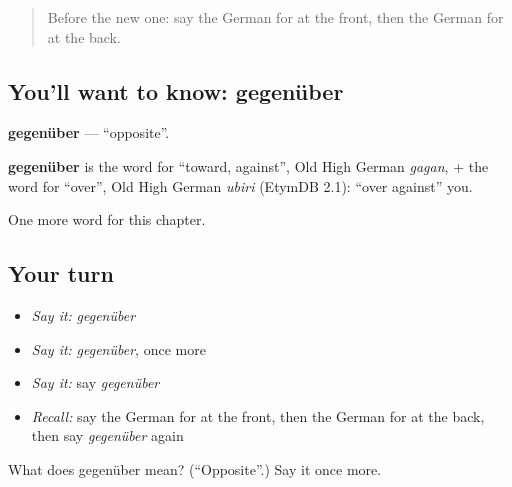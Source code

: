 \begin{quote}
Before the new one: say the German for at the front, then the German for at the back.
\end{quote}

\subsection*{You'll want to know: gegenüber}
\textbf{gegenüber} — \textquotedblleft{}opposite\textquotedblright{}.

\begin{cousinweb}
\textbf{gegenüber} is the word for \textquotedblleft{}toward, against\textquotedblright{}, Old High German \emph{gagan}, + the word for \textquotedblleft{}over\textquotedblright{}, Old High German \emph{ubiri} (EtymDB 2.1): \textquotedblleft{}over against\textquotedblright{} you.
\end{cousinweb}

\begin{grammarlens}[title={What you've built}]
One more word for this chapter.
\end{grammarlens}

\subsection*{Your turn}
\begin{itemize}
\raggedright
  \item \emph{Say it:} \emph{gegenüber}
  \item \emph{Say it:} \emph{gegenüber}, once more
  \item \emph{Say it:} say \emph{gegenüber}
  \item \emph{Recall:} say the German for at the front, then the German for at the back, then say \emph{gegenüber} again
\end{itemize}

\begin{tcolorbox}[breakable,colback=teal!4,colframe=teal!35!black,title={Before you move on}]
What does gegenüber mean? (\textquotedblleft{}Opposite\textquotedblright{}.) Say it once more.
\end{tcolorbox}
